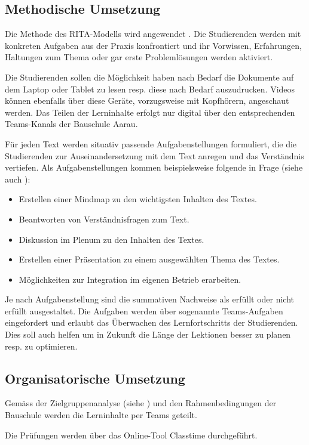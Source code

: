 \documentclass[
11pt,
captions=tableheading,
smallheadings,
headsepline,
footsepline, 
captions=tableheading,
parskip=half-,
]{scrartcl}
\begin{document}
\subsection{Methodische Umsetzung}
Die Methode des RITA-Modells wird angewendet \cite{BerufspädagogischesKonzept_BauschuleAarau}.
Die Studierenden werden mit konkreten Aufgaben aus der Praxis konfrontiert und ihr Vorwissen, Erfahrungen, Haltungen zum Thema oder gar erste Problemlösungen werden aktiviert.

Die Studierenden sollen die Möglichkeit haben nach Bedarf die Dokumente auf dem Laptop oder Tablet zu lesen resp. diese nach Bedarf auszudrucken.
Videos können ebenfalls über diese Geräte, vorzugsweise mit Kopfhörern, angeschaut werden.
Das Teilen der Lerninhalte erfolgt nur digital über den entsprechenden Teams-Kanals der Bauschule Aarau.

Für jeden Text werden situativ passende Aufgabenstellungen formuliert, die die Studierenden zur Auseinandersetzung mit dem Text anregen und das Verständnis vertiefen.
Als Aufgabenstellungen kommen beispielsweise folgende in Frage (siehe auch \cite{unikoelnMethodenpool}):
\begin{itemize}
    \item Erstellen einer Mindmap zu den wichtigsten Inhalten des Textes.
    \item Beantworten von Verständnisfragen zum Text.
    \item Diskussion im Plenum zu den Inhalten des Textes.
    \item Erstellen einer Präsentation zu einem ausgewählten Thema des Textes.
    \item Möglichkeiten zur Integration im eigenen Betrieb erarbeiten.
\end{itemize}
Je nach Aufgabenstellung sind die summativen Nachweise als erfüllt oder nicht erfüllt ausgestaltet.
Die Aufgaben werden über sogenannte Teams-Aufgaben eingefordert und erlaubt das Überwachen des Lernfortschritts der Studierenden.
Dies soll auch helfen um in Zukunft die Länge der Lektionen besser zu planen resp. zu optimieren.


\subsection{Organisatorische Umsetzung}
Gemäss der Zielgruppenanalyse (siehe ) und den Rahmenbedingungen der Bauschule werden die Lerninhalte per Teams geteilt.

Die Prüfungen werden über das Online-Tool Classtime durchgeführt.
\end{document}
